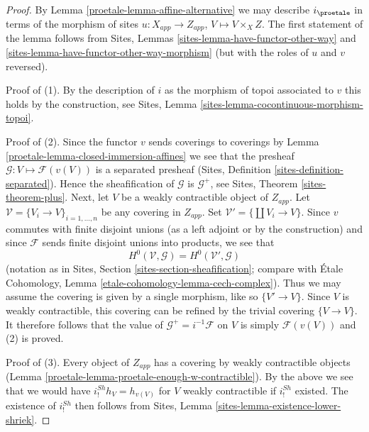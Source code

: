 \begin{proof}

By Lemma \ref{proetale-lemma-affine-alternative} we may describe $i_\proetale$ in terms
of the morphism of sites $u : X_{app} \to Z_{app}$, $V \mapsto V \times_X Z$.
The first statement of the lemma follows from
Sites, Lemmas \ref{sites-lemma-have-functor-other-way} and
\ref{sites-lemma-have-functor-other-way-morphism}
(but with the roles of $u$ and $v$ reversed).

\medskip\noindent
Proof of (1). By the description of $i$ as the morphism of topoi associated
to $v$ this holds by the construction, see
Sites, Lemma \ref{sites-lemma-cocontinuous-morphism-topoi}.

\medskip\noindent
Proof of (2). Since the functor $v$ sends coverings to coverings by
Lemma \ref{proetale-lemma-closed-immersion-affines} we see that the presheaf
$\mathcal{G} : V \mapsto \mathcal{F}(v(V))$ is a separated presheaf
(Sites, Definition \ref{sites-definition-separated}). Hence
the sheafification of $\mathcal{G}$ is $\mathcal{G}^+$, see
Sites, Theorem \ref{sites-theorem-plus}. Next, let $V$ be a weakly
contractible object of $Z_{app}$. Let
$\mathcal{V} = \{V_i \to V\}_{i = 1, \ldots, n}$
be any covering in $Z_{app}$. Set $\mathcal{V}' = \{\coprod V_i \to V\}$.
Since $v$ commutes with finite disjoint unions (as a left adjoint or by
the construction) and since $\mathcal{F}$ sends finite disjoint
unions into products, we see that
$$
H^0(\mathcal{V}, \mathcal{G}) = H^0(\mathcal{V}', \mathcal{G})
$$
(notation as in Sites, Section \ref{sites-section-sheafification};
compare with
\'Etale Cohomology, Lemma \ref{etale-cohomology-lemma-cech-complex}).
Thus we may assume the covering is given by a single morphism, like
so $\{V' \to V\}$. Since $V$ is weakly contractible, this covering
can be refined by the trivial covering $\{V \to V\}$.
It therefore follows that the value of $\mathcal{G}^+ = i^{-1}\mathcal{F}$
on $V$ is simply $\mathcal{F}(v(V))$ and (2) is proved.

\medskip\noindent
Proof of (3). Every object of $Z_{app}$ has a covering by weakly
contractible objects (Lemma \ref{proetale-lemma-proetale-enough-w-contractible}).
By the above we see that we would have $i^{Sh}_!h_V = h_{v(V)}$ for $V$
weakly contractible if $i^{Sh}_!$ existed. The existence of
$i^{Sh}_!$ then follows from
Sites, Lemma \ref{sites-lemma-existence-lower-shriek}.


\end{proof}
